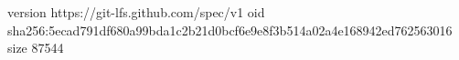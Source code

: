 version https://git-lfs.github.com/spec/v1
oid sha256:5ecad791df680a99bda1c2b21d0bcf6e9e8f3b514a02a4e168942ed762563016
size 87544
